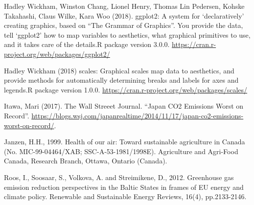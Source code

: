 \documentclass[]{article}
\begin{document}
Hadley Wickham, Winston Chang, Lionel Henry, Thomas Lin Pedersen, Kohske
Takahashi, Claus Wilke, Kara Woo (2018). ggplot2: A system for
`declaratively' creating graphics, based on ``The Grammar of Graphics''.
You provide the data, tell `ggplot2' how to map variables to aesthetics,
what graphical primitives to use, and it takes care of the details.R
package version 3.0.0.
\url{https://cran.r-project.org/web/packages/ggplot2/}

Hadley Wickham (2018) scales: Graphical scales map data to aesthetics,
and provide methods for automatically determining breaks and labels for
axes and legends.R package version 1.0.0.
\url{https://cran.r-project.org/web/packages/scales/}

Itawa, Mari (2017). The Wall Streeet Journal. ``Japan CO2 Emissions
Worst on Record''.
\url{https://blogs.wsj.com/japanrealtime/2014/11/17/japan-co2-emissions-worst-on-record/}.

Janzen, H.H., 1999. Health of our air: Toward sustainable agriculture in
Canada (No. MIC-99-04464/XAB; SSC-A-53-1981/1998E). Agriculture and
Agri-Food Canada, Research Branch, Ottawa, Ontario (Canada).

Roos, I., Soosaar, S., Volkova, A. and Streimikene, D., 2012. Greenhouse
gas emission reduction perspectives in the Baltic States in frames of EU
energy and climate policy. Renewable and Sustainable Energy Reviews,
16(4), pp.2133-2146.
\end{document}
